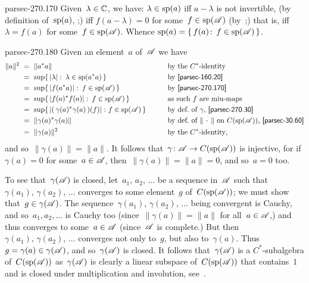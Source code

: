 \documentclass[b5page]{book}
\begin{document}
\begin{solution}{parsec-270.170}
Given~$\lambda\in\mathbb{C}$,
we have: $\lambda\in \mathrm{sp}(a)$
iff $a-\lambda$ is not invertible,
(by definition of~$\mathrm{sp}(a)$, ;)
iff $f(a-\lambda)=0$ for some~$f\in \mathrm{sp}(\mathscr{A})$
(by~;)
that is, iff~$\lambda=f(a)$ for some~$f\in \mathrm{sp}(\mathscr{A})$.
Whence $\mathrm{sp}(a)=\{\,f(a)\colon\, f\in \mathrm{sp}(\mathscr{A})\,\}$.
\end{solution}
\begin{solution}{parsec-270.180}
Given an  element~$a$ of~$\mathscr{A}$
we have
\begin{alignat*}{3}
\|a\|^2  \ &=\ \|a^*a\|
&& \text{by the $C^*$-identity}\\
\ &=\  \sup\{\, \left|\lambda\right|\colon\, 
\lambda\in\spec(a^*a)\,\}
&&\text{by~\sref{parsec-160.20}}\\
\ &=\  \sup\{\, \left|f(a^*a)\right|\colon\, 
f\in\spec(\scrA)\,\}
&&\text{by~\sref{parsec-270.170}}
\\
\ &=\  \sup\{\, \left|f(a)^*f(a)\right|\colon\, 
f\in\spec(\scrA)\,\}
&&\text{as such~$f$ are miu-maps}\\
\ &=\  \sup\{\, \left|(\,\gamma(a)^*\gamma(a)\,)(f)\right|\colon
f\in \spec(\scrA)\,\}
\qquad&&\text{by def.~of~$\gamma$, \sref{parsec-270.30}} \\
\ &=\ \|\gamma(a)^*\gamma(a)\|&&
\text{by def.~of~$\|\,\cdot\,\|$ on~$C(\spec(\scrA))$,
\sref{parsec-30.60}}\\
\ &=\ \|\gamma(a)\|^2
&&\text{by the $C^*$-identity},
\end{alignat*}
and so~$\|\gamma(a)\|=\|a\|$.
It follows that~$\gamma\colon \mathscr{A}\to C(\mathrm{sp}(\mathscr{A}))$
is injective,
for if $\gamma(a)=0$ for some~$a\in\mathscr{A}$,
then~$\|\gamma(a)\|=\|a\|=0$,
and so~$a=0$ too.

To see that~$\gamma(\mathscr{A})$ is closed,
let~$a_1,\,a_2,\,\dotsc$
be a sequence in~$\mathscr{A}$
such that $\gamma(a_1),\,\gamma(a_2),\,\dotsc$
converges to some element~$g$ of~$C(\mathrm{sp}(\mathscr{A}))$;
we must show that~$g\in\gamma(\mathscr{A})$.
The sequence~$\gamma(a_1),\,\gamma(a_2),\,\dotsc$
being convergent is Cauchy,
and so~$a_1,a_2,\dotsc$ is Cauchy too
(since~$\|\gamma(a)\|=\|a\|$ for all~$a\in\mathscr{A}$,)
and thus converges to some~$a\in\mathscr{A}$
(since~$\mathscr{A}$ is complete.)
But then~$\gamma(a_1),\,\gamma(a_2),\,\dotsc$
converges not only to~$g$, but also to~$\gamma(a)$.
Thus~$g=\gamma(a)\in\gamma(\mathscr{A})$,
and so~$\gamma(\mathscr{A})$
is closed.
It follows that~$\gamma(\mathscr{A})$ is a $C^*$-subalgebra of~$C(\mathrm{sp}(\mathscr{A}))$
as~$\gamma(\mathscr{A})$ is clearly a linear subspace
of~$C(\mathrm{sp}(\mathscr{A}))$
that contains~$1$ and is closed under multiplication and involution,
see~.
\end{solution}
\end{document}
